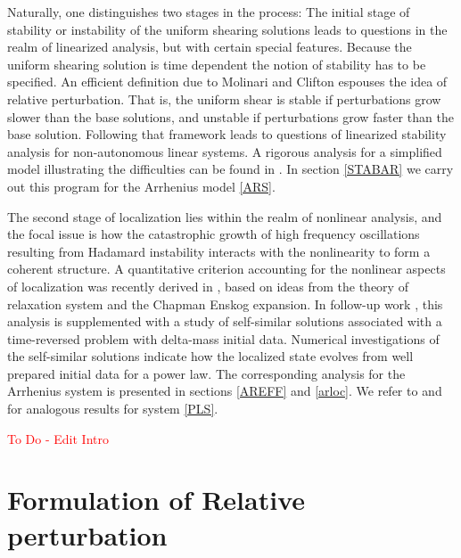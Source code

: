 \documentclass[a4paper,11pt]{article}
\newcommand{\tcr}{\textcolor{red}}
\theoremstyle{remark}
\begin{document}
Naturally, one distinguishes two stages in the process: The initial stage of stability or instability
of the uniform shearing solutions leads to questions in the realm of linearized analysis, but with
certain special features. Because the uniform shearing solution
is time dependent the notion of stability has to be specified. An efficient definition due to
Molinari and Clifton \cite{MC,FM} espouses the idea of relative perturbation. That is, the uniform shear
is stable if perturbations grow slower than the base solutions, and unstable if perturbations grow
faster than the base solution. Following that framework leads to questions of linearized stability analysis
for non-autonomous linear systems.
A rigorous analysis for a simplified model illustrating the difficulties can be found in \cite{Tzavaras92}.
In section \ref{STABAR}  we carry out this program for the Arrhenius model \eqref{ARS}.


The second stage of localization lies within the realm of nonlinear analysis, and the focal issue is how the catastrophic growth of high frequency oscillations resulting from Hadamard instability interacts with
the nonlinearity to form a coherent structure.
A quantitative criterion accounting for the nonlinear aspects of localization was recently derived in \cite{KT},
based on ideas from the theory of relaxation system and the Chapman Enskog expansion. In follow-up
work \cite{KT2}, this analysis is supplemented with a study of self-similar
solutions associated with a time-reversed problem with delta-mass initial data.
Numerical investigations of the self-similar solutions indicate how the localized state evolves
from well prepared initial data for a  power law. The corresponding analysis for the Arrhenius system
is presented in sections \ref{AREFF} and \ref{arloc}.
We refer to \cite{KT} and \cite{KT2} for analogous results for system \eqref{PLS}.

%
%



\tcr{ To Do - Edit Intro}

\section{Formulation of Relative perturbation}
\end{document}
